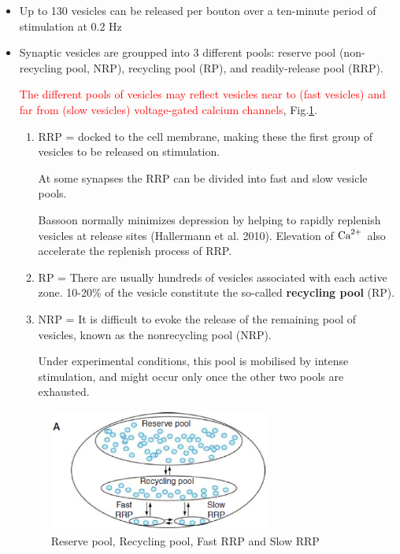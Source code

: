 \begin{itemize}
  \item Up to 130 vesicles can be released per bouton over a ten-minute period
  of stimulation at 0.2 Hz \citep{ikeda2009}
  
  \item Synaptic vesicles are groupped into 3 different pools:
  reserve pool   (non-recycling pool, NRP), recycling pool (RP), and
  readily-release pool (RRP).
  
  \textcolor{red}{The different pools of vesicles may reflect vesicles near to
  (fast vesicles) and far from (slow vesicles) voltage-gated calcium channels},
  Fig.\ref{fig:vesicle-pool}.
  \begin{enumerate}
    \item RRP =  docked to the cell membrane, making these the first group of
    vesicles to be released on stimulation.
    
   At some synapses the RRP can be divided into fast and slow vesicle pools.
   
Bassoon normally minimizes depression by helping to rapidly replenish vesicles
at release sites (Hallermann et al. 2010). Elevation of ${\text{Ca}^{2+}}$ also accelerate
the replenish process of RRP.

   
    \item RP =   There are usually hundreds of vesicles associated with each active zone.
  10-20\% of the vesicle constitute the so-called {\bf recycling pool} (RP).
    
    
    \item NRP =   It is difficult to evoke the release of the remaining pool of vesicles, known
  as the nonrecycling pool (NRP).

     Under experimental conditions, this pool is mobilised by intense
    stimulation, and might occur only once the other two pools are exhausted.
        
  \end{enumerate}
  
\begin{figure}[htb]
  \centerline{\includegraphics[height=4cm]{./images/vesicle-pool.eps}}
  \caption{Reserve pool, Recycling pool, Fast RRP and
  Slow RRP}\label{fig:vesicle-pool}
\end{figure}


\end{itemize}
